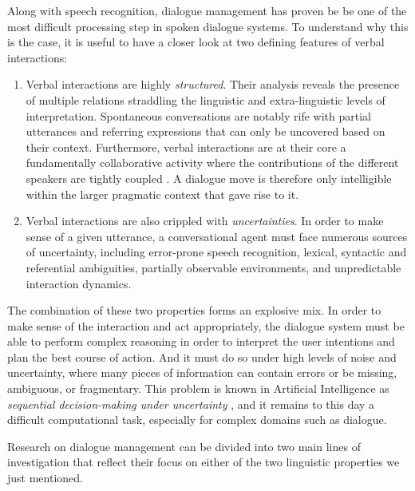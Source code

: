 Along with speech recognition, dialogue management has proven be be one of the most difficult processing step in spoken dialogue systems. To understand why this is the case, it is useful to have a closer look at two defining features of verbal interactions:
\begin{enumerate}
\item Verbal interactions are highly \textit{structured}.  Their analysis reveals the presence of multiple relations straddling the linguistic and extra-linguistic levels of interpretation. Spontaneous conversations are notably rife with partial utterances and referring expressions that can only be uncovered based on their context. Furthermore, verbal interactions are at their core a fundamentally collaborative activity where the contributions of the different speakers are tightly coupled \citep{Clark96,Garrod2004}. A dialogue move is therefore only intelligible within the larger pragmatic context that gave rise to it. 

\item Verbal interactions are also crippled with \textit{uncertainties}.  In order to make sense of a given utterance, a conversational agent must face numerous sources of uncertainty, including error-prone speech recognition, lexical,  syntactic and referential ambiguities, partially observable environments, and unpredictable interaction dynamics.  
\end{enumerate} 

The combination of these two properties forms an explosive mix.  In order to make sense of the interaction and act appropriately, the dialogue system must be able to perform complex reasoning in order to interpret the user intentions and plan the best course of action.  And it must do so under high levels of noise and uncertainty, where many pieces of information can contain errors or be missing, ambiguous, or fragmentary. This problem is known in Artificial Intelligence as \textit{sequential decision-making under uncertainty} \citep{Kaelbling:1998,aima2010}, and it remains to this day a difficult computational task, especially for complex domains such as dialogue. 

Research on dialogue management can be divided into two main lines of investigation that reflect their focus on either of the two linguistic properties we just mentioned.  

